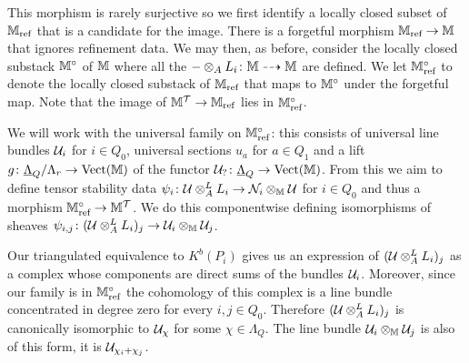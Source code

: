 \documentclass[12pt]{amsart}
\begin{document}
This morphism is rarely surjective so we first identify a locally closed subset of $\mathbb{M}_\text{ref}$ that is a candidate for the image. There is a forgetful morphism $\mathbb{M}_\text{ref} \rightarrow \mathbb{M}$ that ignores refinement data.
We may then, as before, consider the locally closed substack $\mathbb{M}^\circ$ of $\mathbb{M}$ where all the $-\otimes_A L_i \colon \mathbb{M} \dashrightarrow \mathbb{M}$ are defined. We let $\mathbb{M}_\text{ref}^\circ$ to denote the locally closed substack of $\mathbb{M}_\text{ref}$ that maps to $\mathbb{M}^\circ$ under the forgetful map. Note that the image of $\mathbb{M}^{\mathcal{T}} \rightarrow \mathbb{M}_\text{ref}$ lies in $\mathbb{M}_\text{ref}^\circ$.

We will work with the universal family on $\mathbb{M}_\text{ref}^\circ$: this consists of universal line bundles $\mathcal{U}_i$ for $i \in Q_0$, universal sections $u_a$ for $a \in Q_1$ and a lift $g \colon \underline{\Lambda}_Q/\Lambda_r \rightarrow \operatorname{Vect}(\mathbb{M})$ of the functor $\mathcal{U}_? \colon \underline{\Lambda}_Q \rightarrow \operatorname{Vect}(\mathbb{M})$.
From this we aim to define tensor stability data $\psi_i \colon \mathcal{U} \otimes_A^L L_i \rightarrow \mathcal{N}_i \otimes_{\mathbb{M}} \mathcal{U}$ for $i\in Q_0$ and thus a morphism $\mathbb{M}_\text{ref}^\circ \rightarrow \mathbb{M}^{\mathcal{T}}$.
We do this componentwise defining isomorphisms of sheaves $\psi_{i,j} \colon (\mathcal{U} \otimes_A^L L_i)_j \rightarrow \mathcal{U}_i \otimes_{\mathbb{M}} \mathcal{U}_j$.

Our triangulated equivalence to $K^b(P_i)$ gives us an expression of $(\mathcal{U} \otimes_A^L L_i)_j$ as a complex whose components are direct sums of the bundles $\mathcal{U}_i$.
Moreover, since our family is in $\mathbb{M}_\text{ref}^\circ$ the cohomology of this complex is a line bundle concentrated in degree zero for every $i,j \in Q_0$.
Therefore $(\mathcal{U} \otimes_A^L L_i)_j$ is canonically isomorphic to $\mathcal{U}_{\chi}$ for some $\chi \in \Lambda_{Q}$.
The line bundle $\mathcal{U}_i \otimes_{\mathbb{M}} \mathcal{U}_j$ is also of this form, it is $\mathcal{U}_{\chi_i+\chi_j}$.
\end{document}
